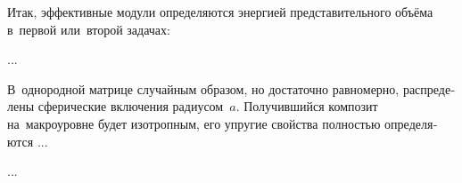 

\label{section:composites.eshelbyformulas}

\begin{otherlanguage}{russian}

Итак, эффективные модули определяются энергией представительного объёма в~первой или~второй задачах:

...



\end{otherlanguage}



\label{section:composites.materialwithsphericalinclusions}

\begin{otherlanguage}{russian}

В~однородной матрице случайным образом, но достаточно равномерно, распределены сферические включения радиусом~$a$. Получившийся композит на~макроуровне будет изотропным, его упругие свойства полностью определяются ...

...



\end{otherlanguage}



